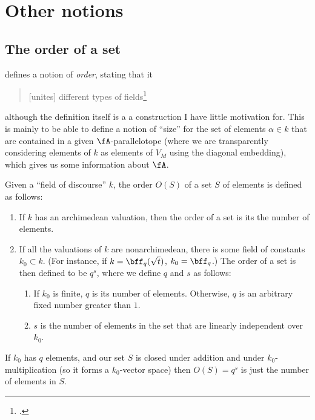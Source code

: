 \section{Other notions}
\subsection{The order of a set}
\label{sec:order}

\cite{artinwhaples} defines a notion of \textit{order},
stating that it
\begin{quotation}
  [unites] different types of fields\footcite[p. 474]{artinwhaples}
\end{quotation}

although the definition itself is a a construction I have little motivation for.
This is mainly to be able to define a notion of ``size'' for the set of elements
$\alpha \in k$ that are contained in a given $\fA$-parallelotope (where we are
transparently considering elements of $k$ as elements of $V_M$ using the
diagonal embedding), which gives us some information about $\fA$.

\begin{defn}
  Given a ``field of discourse'' $k$, the order $O(S)$ of a set $S$ of elements
  is defined as follows:
  \begin{enumerate}
  \item If $k$ has an archimedean valuation, then the order of a set is its the
    number of elements.
  \item If all the valuations of $k$ are nonarchimedean, there is some field of
    constants $k_0 \subset k$. (For instance, if $k = \bff_q(\sqrt t)$, $k_0 =
    \bff_q$.) The order of a set is then defined to be $q^s$, where we define
    $q$ and $s$ as follows:
    \begin{enumerate}
    \item If $k_0$ is finite, $q$ is its number of elements. Otherwise, $q$ is
      an arbitrary fixed number greater than $1$.
    \item $s$ is the number of elements in the set that are linearly independent
      over $k_0$.
    \end{enumerate}
  \end{enumerate}
\end{defn}

If $k_0$ has $q$ elements, and our set $S$ is closed under addition and under
$k_0$-multiplication (so it forms a $k_0$-vector space) then $O(S) = q^s$ is
just the number of elements in $S$.

